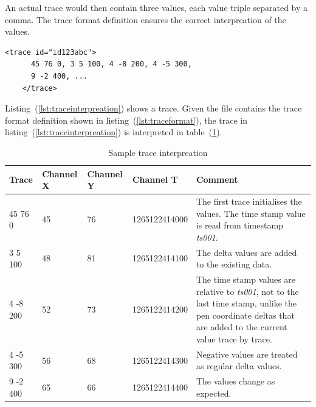 An actual trace would then contain three values, each value triple separated by
a comma. The trace format definition ensures the correct interpreation of the 
values.
\begin{xmlcode}
  \begin{lstlisting}[emph={trace,channel},
                     emphstyle=\color{blue}\textbf,
                     emph={[2]name,type,units,respectTo,id},
                     emphstyle={[2]\color{red}},
                     caption={A sample trace},
                     label=lst:traceinterpreation]
    <trace id="id123abc">
      45 76 0, 3 5 100, 4 -8 200, 4 -5 300,
      9 -2 400, ...
    </trace>
  \end{lstlisting}
\end{xmlcode}
Listing~(\ref{lst:traceinterpreation}) shows a trace. Given the file contains
the trace format definition shown in listing~(\ref{lst:traceformat}), the trace 
in listing~(\ref{lst:traceinterpreation}) is interpreted in 
table~(\ref{table:sampletraceinterpretation}). 

\begin{table}[htbp]
  \begin{tabular}{|l||l|l|l|p{200pt}|}
    \hline
    Trace & Channel X & Channel Y & Channel T & Comment \\
    \hline
    45 76 0 & 45 & 76  & 1265122414000 & The first trace initialises 
                                         the values. The time stamp value is
                                         read from timestamp \emph{ts001}. \\
    \hline
    3 5 100 & 48 & 81 &  1265122414100 & The delta values are added to the
                                         existing data. \\
    \hline
    4 -8 200 & 52 & 73 &  1265122414200 & The time stamp values are relative to
                                          \emph{ts001}, not to the last time 
                                          stamp, unlike the pen coordinate 
                                          deltas that are added to the current 
                                          value trace by trace. \\
    \hline
    4 -5 300 & 56 & 68 &  1265122414300 & Negative values are treated as regular
                                          delta values. \\
    \hline
    9 -2 400 & 65 & 66 &  1265122414400 & The values change as expected. \\
    \hline
  \end{tabular}
\caption{Sample trace interpreation}
\label{table:sampletraceinterpretation}
\end{table}

